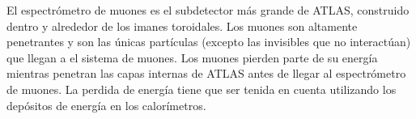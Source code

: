 El espectrómetro de muones es el subdetector más grande de ATLAS, construido
dentro y alrededor de los imanes toroidales. Los muones son altamente penetrantes
y son las únicas partículas (excepto las invisibles que no interactúan) que llegan
a el sistema de muones. Los muones pierden parte de su energía mientras penetran
las capas internas de ATLAS antes de llegar al espectrómetro de muones. La perdida
de energía tiene que ser tenida en cuenta utilizando los depósitos de energía
en los calorímetros.


